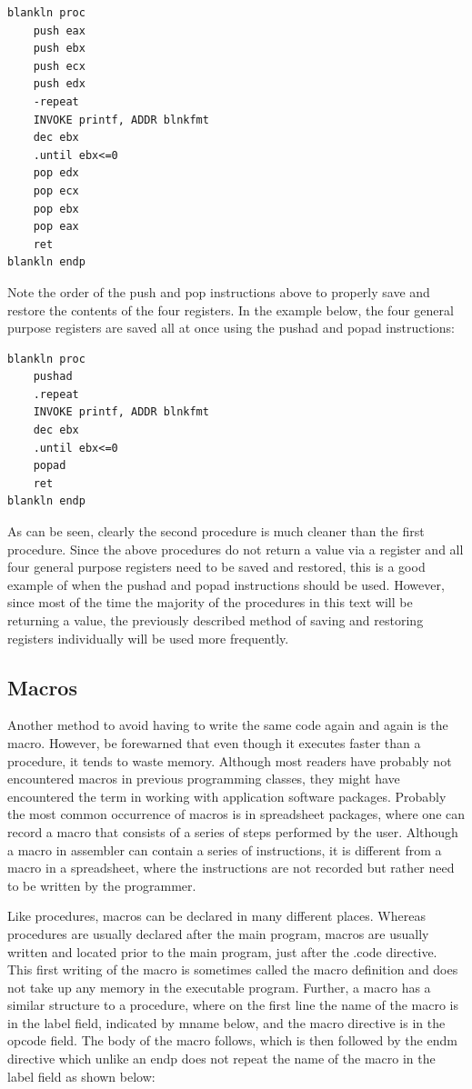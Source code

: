 \documentclass[10pt]{article}
\begin{document}
\begin{verbatim}
blankln proc
    push eax
    push ebx
    push ecx
    push edx
    -repeat
    INVOKE printf, ADDR blnkfmt
    dec ebx
    .until ebx<=0
    pop edx
    pop ecx
    pop ebx
    pop eax
    ret
blankln endp
\end{verbatim}

Note the order of the push and pop instructions above to properly save and restore the contents of the four registers. In the example below, the four general purpose registers are saved all at once using the pushad and popad instructions:

\begin{verbatim}
blankln proc
    pushad
    .repeat
    INVOKE printf, ADDR blnkfmt
    dec ebx
    .until ebx<=0
    popad
    ret
blankln endp
\end{verbatim}

As can be seen, clearly the second procedure is much cleaner than the first procedure. Since the above procedures do not return a value via a register and all four general purpose registers need to be saved and restored, this is a good example of when the pushad and popad instructions should be used. However, since most of the time the majority of the procedures in this text will be returning a value, the previously described method of saving and restoring registers individually will be used more frequently.

\subsection*{Macros}
Another method to avoid having to write the same code again and again is the macro. However, be forewarned that even though it executes faster than a procedure, it tends to waste memory. Although most readers have probably not encountered macros in previous programming classes, they might have encountered the term in working with application software packages. Probably the most common occurrence of macros is in spreadsheet packages, where one can record a macro that consists of a series of steps performed by the user. Although a macro in assembler can contain a series of instructions, it is different from a macro in a spreadsheet, where the instructions are not recorded but rather need to be written by the programmer.

Like procedures, macros can be declared in many different places. Whereas procedures are usually declared after the main program, macros are usually written and located prior to the main program, just after the .code directive. This first writing of the macro is sometimes called the macro definition and does not take up any memory in the executable program. Further, a macro has a similar structure to a procedure, where on the first line the name of the macro is in the label field, indicated by mname below, and the macro directive is in the opcode field. The body of the macro follows, which is then followed by the endm directive which unlike an endp does not repeat the name of the macro in the label field as shown below:
\end{document}
